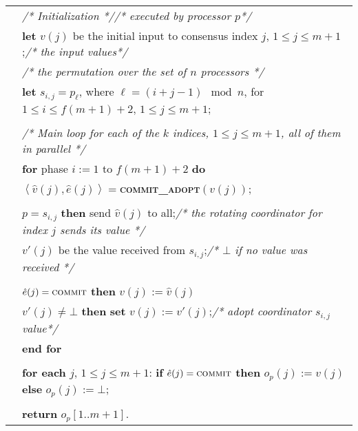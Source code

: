 \documentclass[11pt]{article}
\newcommand{\tri}[1]{\left<#1 \right>}
\newcommand{\mSetCons}{\textsc{Dynamic $(m+1)$-vector-set Consensus}\xspace}
\newcommand{\tb}{\makebox[0.6cm]{}}
\newcommand{\Byzantine}[0]{\mbox{\emph{Byzantin}\hspace{-0.15em}\emph{e}}\xspace}
\newcommand{\ca}{{\small\textsc{commit\!\_adopt}}\xspace}
\begin{document}
\begin{algorithm}[!ht]
\footnotesize
{}
 \setcounter{AlgoLine}{0}
\begin{tabular}{ r l }
\nl & \textit{/* Initialization */}\mbox{\hspace{2.5in}}\hfill\textit{/* executed by processor $p$*/}\\
\lnl{line:input}& {\bf let} $v(j)$ be the initial input to consensus index $j$, $1\le j\le m+1$;\hfill\textit{/* the input values*/}\\
\nl &\tb\textit{/* the permutation over the set of  $n$ processors */}\\
\lnl{line:assign} & {\bf let} $s_{i,j}=p_\ell$, where $\ell=(i+j-1)\mod n$, for $1\le i\le  f(m+1)+2$, $1\le j\le m+1$;\\
\\
\nl & \textit{/* Main loop for each of the $k$ indices, $1\le j\le m+1$, all of them in parallel */}\\
\nl & {\bf for} phase $i:=1$ to $ f(m+1)+2$ {\bf do}\\

\lnl{line:ca} & \tb   $\tri{\hat v(j),\hat e(j)}=${\bf \ca}$(v(j))$;\\
\\
\lnl{line:sender} & \tb  {\bf if} $p=s_{i,j}$ {\bf then}    send $\hat v(j)$ to all;\hfill\textit{/* the rotating coordinator for index $j$ sends its value */}\\
\lnl{line:vote} & \tb\tb  {\bf let} $v'(j)$ be the value received from $s_{i,j}$;\hfill\textit{/* $\bot$ if no value was received */}\\
\\
\lnl{line:update1} & \tb {\bf if} $\hat e(j)= \mbox{\sc commit}$ {\bf then}  $v(j) := \hat v(j)$\\
\lnl{line:update2} & \tb\tb  {\bf else if} $v'(j)\not=\bot$ {\bf then} {\bf set} $v(j) := v'(j)$;\hfill\textit{/*  adopt coordinator $s_{i,j}$   value*/}\\
\nl & {\bf end for}\\
\\
\lnl{line:output}& {\bf for each} $j$, $1\le j\le m+1$: {\bf if} $\hat e(j)= \mbox{\sc commit}$ {\bf then} $o_p(j):=v(j)$  {\bf else} $o_p(j):=\bot$;\\
\\
\nl & {\bf return} $o_p[1..m+1]$.
\end{tabular}
 \caption[caption]{$\mSetCons$:  \\\hspace{\textwidth}\mbox{\ \hspace{0.75in}}a  \Byzantine $m+1$-vector-set consensus algorithm}\label{figure:mSetCons}
\end{algorithm}
\end{document}
